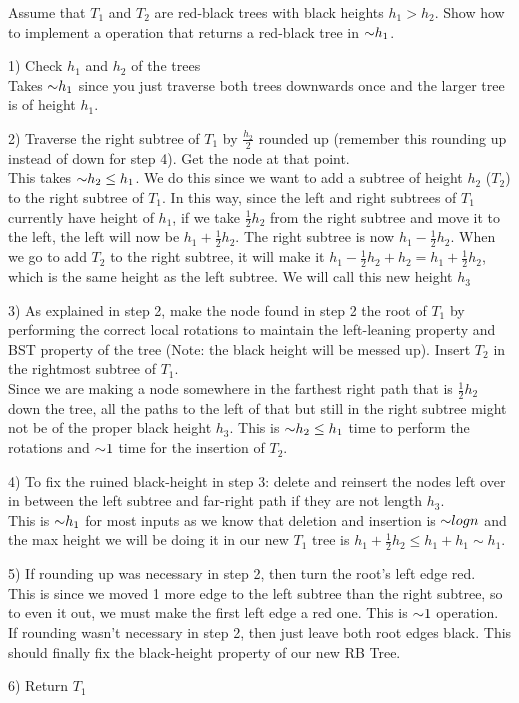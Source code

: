\begin{problem}
\begin{questions}
\item Assume that $T_1$ and $T_2$ are red-black trees with black heights $h_1 > h_2$. Show how to implement a  operation that returns a red-black tree in $\mathord{\sim}h_1$.

1) Check $h_1$ and $h_2$ of the trees\\
Takes $\mathord{\sim}h_1$ since you just traverse both trees downwards once and the larger tree is of height $h_1$.

2) Traverse the right subtree of $T_1$ by $\frac{h_2}{2}$ rounded up (remember this rounding up instead of down for step 4). Get the node at that point.\\
This takes $\mathord{\sim}h_2 \leq h_1$.
We do this since we want to add a subtree of height $h_2$ ($T_2$) to the right subtree of $T_1$.
In this way, since the left and right subtrees of $T_1$ currently have height of $h_1$, if we take $\frac{1}{2} h_2$ from the right subtree and move it to the left, the left will now be $h_1 + \frac{1}{2} h_2$.
The right subtree is now $h_1 - \frac{1}{2} h_2$. When we go to add $T_2$ to the right subtree, it will make it $h_1 - \frac{1}{2} h_2 + h_2 = h_1 + \frac{1}{2} h_2$, which is the same height as the left subtree.
We will call this new height $h_3$

3) As explained in step 2, make the node found in step 2 the root of $T_1$ by performing the correct local rotations to maintain the left-leaning property and BST property of the tree (Note: the black height will be messed up). Insert $T_2$ in the rightmost subtree of $T_1$.\\
Since we are making a node somewhere in the farthest right path that is $\frac{1}{2} h_2$ down the tree, all the paths to the left of that but still in the right subtree might not be of the proper black height $h_3$.
This is $\mathord{\sim}h_2 \leq h_1$ time to perform the rotations and $\mathord{\sim}1$ time for the insertion of $T_2$. 

4) To fix the ruined black-height in step 3: delete and reinsert the nodes left over in between the left subtree and far-right path if they are not length $h_3$.\\
This is $\mathord{\sim}h_1$ for most inputs as we know that deletion and insertion is $\mathord{\sim}log n$ and the max height we will be doing it in our new $T_1$ tree is $h_1 + \frac{1}{2} h_2 \leq h_1 + h_1 \sim h_1$.

5) If rounding up was necessary in step 2, then turn the root's left edge red.\\
This is since we moved 1 more edge to the left subtree than the right subtree, so to even it out, we must make the first left edge a red one. This is $\mathord{\sim}1$ operation.
If rounding wasn't necessary in step 2, then just leave both root edges black.
This should finally fix the black-height property of our new RB Tree.

6) Return $T_1$\\

\end{questions}
\end{problem}


